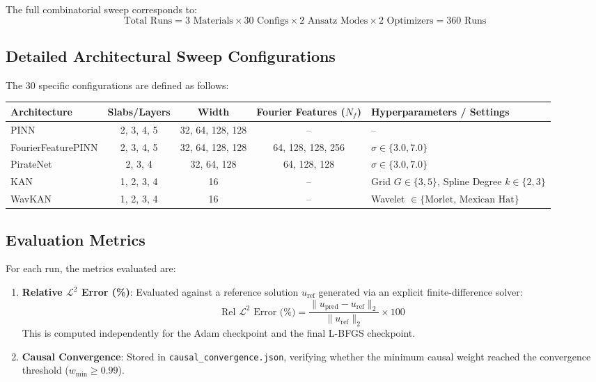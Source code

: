 \documentclass[11pt, a4paper]{article}
\newcommand{\file}[1]{\texttt{#1}}
\begin{document}
The full combinatorial sweep corresponds to:
\begin{equation}
  \text{Total Runs} = 3 \text{ Materials} \times 30 \text{ Configs} \times 2 \text{ Ansatz Modes} \times 2 \text{ Optimizers} = 360 \text{ Runs}
\end{equation}

\subsection{Detailed Architectural Sweep Configurations}

The 30 specific configurations are defined as follows:

\begin{center}
\begin{tabular}{lcccl}
\toprule
\textbf{Architecture} & \textbf{Slabs/Layers} & \textbf{Width} & \textbf{Fourier Features ($N_f$)} & \textbf{Hyperparameters / Settings} \\
\midrule
PINN & 2, 3, 4, 5 & 32, 64, 128, 128 & -- & -- \\
FourierFeaturePINN & 2, 3, 4, 5 & 32, 64, 128, 128 & 64, 128, 128, 256 & $\sigma \in \{3.0, 7.0\}$ \\
PirateNet & 2, 3, 4 & 32, 64, 128 & 64, 128, 128 & $\sigma \in \{3.0, 7.0\}$ \\
KAN & 1, 2, 3, 4 & 16 & -- & Grid $G \in \{3, 5\}$, Spline Degree $k \in \{2, 3\}$ \\
WavKAN & 1, 2, 3, 4 & 16 & -- & Wavelet $\in \{\text{Morlet, Mexican Hat}\}$ \\
\bottomrule
\end{tabular}
\end{center}

\subsection{Evaluation Metrics}

For each run, the metrics evaluated are:
\begin{enumerate}
  \item \textbf{Relative $\mathcal{L}^2$ Error (\%)}: Evaluated against a reference solution $u_{\mathrm{ref}}$ generated via an explicit finite-difference solver:
  \begin{equation}
    \text{Rel } \mathcal{L}^2 \text{ Error (\%)} = \frac{\| u_{\mathrm{pred}} - u_{\mathrm{ref}} \|_2}{\| u_{\mathrm{ref}} \|_2} \times 100
  \end{equation}
  This is computed independently for the Adam checkpoint and the final L-BFGS checkpoint.
  \item \textbf{Causal Convergence}: Stored in \file{causal\_convergence.json}, verifying whether the minimum causal weight reached the convergence threshold ($w_{\min} \geq 0.99$).
\end{enumerate}
\end{document}
